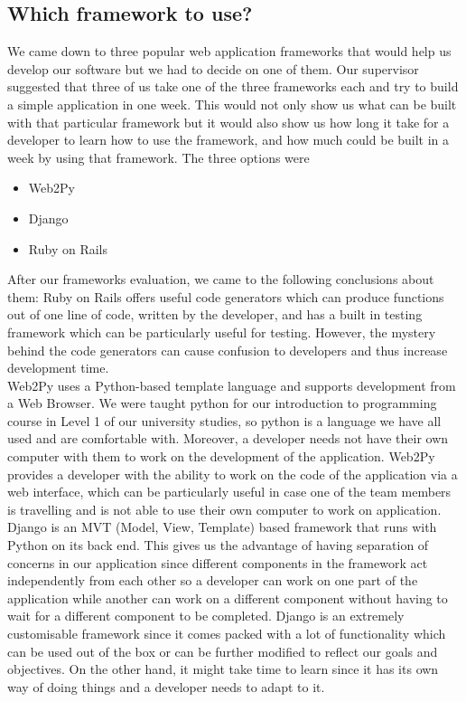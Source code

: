 \documentclass{l3proj}
\begin{document}
\subsection {Which framework to use?}
We came down to three popular web application frameworks that would help us develop 
our software but we had to decide on one of them. Our supervisor suggested that three 
of us take one of the three frameworks each and try to build a simple application in one 
week. This would not only show us what can be built with that particular framework but 
it would also show us how long it take for a developer to learn how to use the 
framework, and how much could be built in a week by using that framework. The three 
options were 
\begin{itemize}
\item Web2Py 
\item Django 
\item Ruby on Rails 
\end{itemize}
After our frameworks evaluation, we came to the following conclusions about them: 
Ruby on Rails offers useful code generators which can produce functions out of one line 
of code, written by the developer, and has a built in testing framework which can be 
particularly useful for testing. However, the mystery behind the code generators can 
cause confusion to developers and thus increase development time. \\
Web2Py uses a Python-based template language and supports development from a Web 
Browser. We were taught python for our introduction to programming course in Level 
1 of our university studies, so python is a language we have all used and are 
comfortable with. Moreover, a developer needs not have their own computer with them 
to work on the development of the application. Web2Py provides a developer with the ability 
to work on the code of the application via a web interface, which can be particularly 
useful in case one of the team members is travelling and is not able to use their own 
computer to work on application. \\
Django is an MVT (Model, View, Template) based framework that runs with Python on 
its back end. This gives us the advantage of having separation of concerns in our 
application since different components in the framework act independently from each 
other so a developer can work on one part of the application while another can work on 
a different component without having to wait for a different component to be completed. 
Django is an extremely customisable framework since it comes packed with a lot of 
functionality which can be used out of the box or can be further modified to reflect our 
goals and objectives. On the other hand, it might take time to learn since it has its own 
way of doing things and a developer needs to adapt to it.
\end{document}
